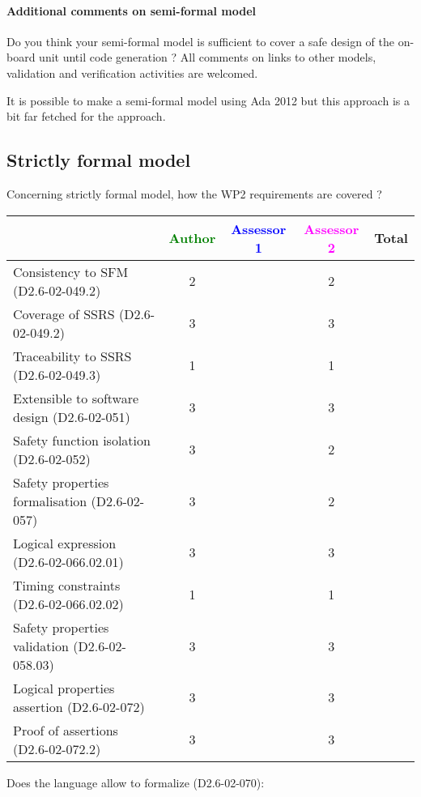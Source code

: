 \paragraph{Additional comments on semi-formal  model} Do you think your semi-formal  model is sufficient to cover a safe design of the on-board unit until code generation ?
All comments on links to  other models, validation and verification activities are welcomed.

It is possible to make a semi-formal model using Ada 2012 but this
approach is a bit far fetched for the approach.

\subsection{Strictly formal model}

Concerning strictly formal model, how the WP2 requirements are covered ?

\begin{tabular}{|l | c | c | c | c|}
\hline
& \textcolor{green}{Author} & \textcolor{blue}{Assessor 1} & \textcolor{magenta}{Assessor 2} & Total \\
\hline 
Consistency to SFM (D2.6-02-049.2) & 2    & & 2    &  \\
\hline
Coverage of SSRS (D2.6-02-049.2)  & 3    & & 3    &  \\
\hline
Traceability to  SSRS (D2.6-02-049.3)  & 1    & & 1    &  \\
\hline
Extensible to software design (D2.6-02-051)  & 3    & & 3    &  \\
\hline
Safety function isolation (D2.6-02-052)  & 3    & & 2    &  \\
\hline 
Safety properties formalisation (D2.6-02-057)  & 3    & & 2    &  \\
\hline
Logical expression (D2.6-02-066.02.01)  & 3    & & 3    &  \\
\hline
Timing constraints (D2.6-02-066.02.02)  & 1    & & 1    &  \\
\hline
Safety properties validation (D2.6-02-058.03)  & 3    & & 3    &  \\
\hline
Logical properties assertion (D2.6-02-072)  & 3    & & 3    &  \\
\hline
Proof of assertions (D2.6-02-072.2)  & 3    & & 3    &  \\
\hline
\end{tabular}

Does the language allow to  formalize (D2.6-02-070):

